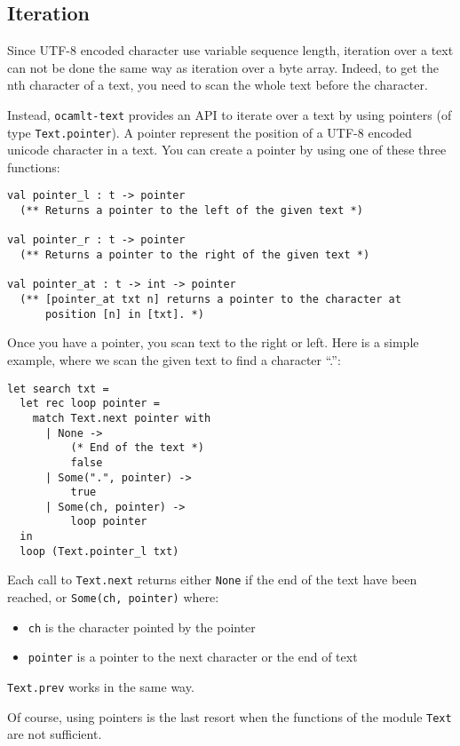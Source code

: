 \documentclass{article}
\newcommand{\oct}{\texttt{ocamlt-text}\xspace}
\begin{document}
\subsection{Iteration}

Since UTF-8 encoded character use variable sequence length, iteration
over a text can not be done the same way as iteration over a byte
array. Indeed, to get the nth character of a text, you need to scan
the whole text before the character.

Instead, \oct provides an API to iterate over a text by using pointers
(of type \texttt{Text.pointer}). A pointer represent the position of a
UTF-8 encoded unicode character in a text. You can create a pointer by
using one of these three functions:

\begin{verbatim}
val pointer_l : t -> pointer
  (** Returns a pointer to the left of the given text *)

val pointer_r : t -> pointer
  (** Returns a pointer to the right of the given text *)

val pointer_at : t -> int -> pointer
  (** [pointer_at txt n] returns a pointer to the character at
      position [n] in [txt]. *)
\end{verbatim}

Once you have a pointer, you scan text to the right or left. Here is a
simple example, where we scan the given text to find a character ``.'':

\begin{verbatim}
let search txt =
  let rec loop pointer =
    match Text.next pointer with
      | None ->
          (* End of the text *)
          false
      | Some(".", pointer) ->
          true
      | Some(ch, pointer) ->
          loop pointer
  in
  loop (Text.pointer_l txt)
\end{verbatim}

Each call to \texttt{Text.next} returns either \texttt{None} if the
end of the text have been reached, or \texttt{Some(ch, pointer)} where:

\begin{itemize}
\item \texttt{ch} is the character pointed by the pointer
\item \texttt{pointer} is a pointer to the next character or the end of text
\end{itemize}

\texttt{Text.prev} works in the same way.

Of course, using pointers is the last resort when the functions of the
module \texttt{Text} are not sufficient.
\end{document}
